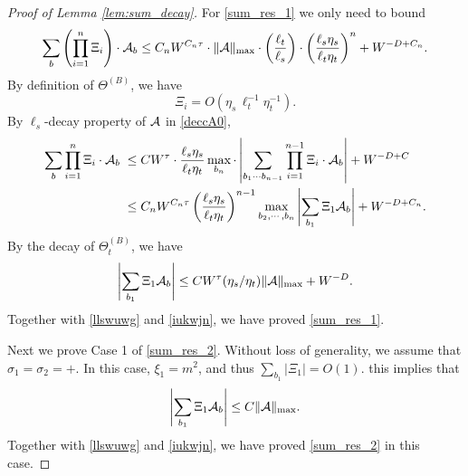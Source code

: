\documentclass[10pt,reqno]{article}
\theoremstyle{plain} %
\theoremstyle{remark}
\numberwithin{equation}{section}
\begin{document}
\begin{proof}[Proof of Lemma \ref{lem:sum_decay}]
For \eqref{sum_res_1} we only need to bound
\begin{align}
    \sum_{\textbf{b}}  \left(\prod_{i=1}^n  \Xi_i \right) \cdot 
{\cal A}_{\textbf{b}} \le C_n W^{C_n \tau} \cdot\|\mathcal{A}\|_{\max } \cdot\left(\frac{\ell_t}{\ell_s}\right) \cdot\left(\frac{\ell_s \eta_s}{\ell_t \eta_t}\right)^n+W^{-D+C_n}.
\end{align}
By definition of $\Theta^{(B)}$, we have 
$$
\Xi_i=O\left( \eta_s \,\ell_t^{-1}\eta_t^{-1}\right).
$$
By  $\ell_s$-decay property of $\cal A$ in \eqref{deccA0}, 
\begin{align}\label{llswuwg}
  \sum_{\textbf{b}}   \prod_{i=1}^n  \Xi_i  \cdot 
{\cal A}_{\textbf{b}}
\;\le\; & C W^{\tau}\cdot \frac{\ell_s \eta_s}{\ell_t \eta_t} \max_{b_n}
\cdot \left|\sum_{b_1\cdots b_{n-1}} \prod_{i=1}^{n-1}  \Xi_i  \cdot 
{\cal A}_{\textbf{b}}\right|+W^{-D+C}
\\\nonumber
\;\le\; & C_n W^{C_n\tau} \left(\frac{\ell_s \eta_s}{\ell_t \eta_t} \right)^{n-1} \max_{b_2,\cdots, b_n}  \left|\sum_{b_1 }\Xi_1 {\cal A}_{\textbf{b}}\right|+W^{-D+C_n}. 
\end{align}
By the decay of $\Theta^{(B)}_t$, we have 
\begin{align}\label{tyzcsq}
  \left|\sum_{b_1 }\Xi_1 {\cal A}_{\textbf{b}}\right|\le CW^\tau (\eta_s/\eta_t)\|{\cal A}\|_{\max}+W^{-D}  .
\end{align}
 Together with \eqref{llswuwg} and \eqref{iukwjn}, we have proved  \eqref{sum_res_1}. 

Next we prove Case 1 of \eqref{sum_res_2}. Without loss of generality, we assume that $\sigma_1=\sigma_2=+$. In this case, $\xi_1=m^2$, and thus  $\sum_{b_1}|\Xi_1|=O(1)$. this  implies that 
$$
\left|\sum_{b_1 }\Xi_1 {\cal A}_{\textbf{b}}\right|\le  C\|{\cal A}\|_{\max} .
$$
Together with \eqref{llswuwg} and \eqref{iukwjn}, we have proved  \eqref{sum_res_2} in this case. 



\end{proof}
\end{document}

